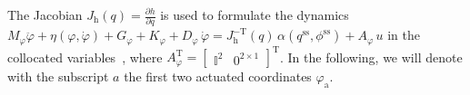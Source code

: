 The Jacobian $J_\mathrm{h}(q) = \frac{\partial h}{\partial q}$ is used to formulate the dynamics $M_\varphi \ddot{\varphi} + \eta(\varphi, \dot{\varphi}) + G_\varphi + K_\varphi + D_\varphi \, \dot{\varphi} = J_\mathrm{h}^\mathrm{-T}(q) \, \alpha(q^\mathrm{ss},\phi^\mathrm{ss}) + A_\varphi \, u $ in the collocated variables~\cite{khatib1987unified}, where $A_\varphi^\mathrm{T} = \begin{bmatrix}
    \mathbb{I}^{2} & 0^\mathrm{2 \times 1}
\end{bmatrix}^\mathrm{T}$. In the following, we will denote with the subscript $a$ the first two actuated coordinates $\varphi_\mathrm{a}$.
